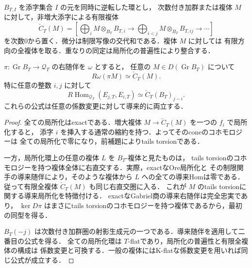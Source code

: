 $B_{T,I}$ を添字集合 $I$ の元を同時に逆転した環とし，
次数付き加群または複体 $M$ に対して，非増大添字による有限複体
\[
 \check C_T(M)=\left[
 \bigoplus_i M\otimes_{B_T}B_{T,i}\longrightarrow
 \bigoplus_{i<j}M\otimes_{B_T}B_{T,ij}\longrightarrow\cdots\right]
\]
を次数0から置く．微分は制限写像の交代和である．複体 $M$ に対しては
有限方向の全複体を取る．重なりの同定は局所化の普遍性により整合する．

\begin{proposition}[有限\v{C}ech模型]
\label{prop:artin-cech-model}
$\pi:\operatorname{Gr}B_T\to\mathcal Q_T$ の右随伴を $\omega$ とすると，
任意の $M\in D(\operatorname{Gr}B_T)$ について
\[
 R\omega(\pi M)\simeq\check C_T(M).
\]
特に任意の整数 $i,j$ に対して
\[
 R\operatorname{Hom}_{\mathcal Q_T}(E_{j,T},E_{i,T})
 \simeq\check C_T(B_T)_{j-i}.
\]
これらの公式は任意の係数変更に対して導来的に両立する．
\end{proposition}
\begin{proof}
全ての局所化はexactである．増大複体 $M\to\check C_T(M)$ を一つの $f_i$ で局所化すると，
添字 $i$ を挿入する通常の縮約を持つ．よってそのconeのコホモロジーは
全ての局所化で零になり，前補題によりtails torsionである．

一方，局所化環上の任意の複体 $L$ を $B_T$-複体と見たものは，
tails torsionのコホモロジーを持つ複体全体に右直交する．実際，exactなOre局所化と
その制限関手の導来随伴により，そのような複体から $L$ への全ての導来Homは零である．
従って有限全複体 $\check C_T(M)$ も同じ右直交圏に入る．
これが $M$ のtails torsionに関する導来局所化を特徴付ける．
exactなGabriel商の導来右随伴は完全忠実であり，
$\ker D\pi$ はまさにtails torsionのコホモロジーを持つ複体であるから，最初の同型を得る．

$B_T(-j)$ は次数付き加群圏の射影生成元の一つである．導来随伴を適用して二番目の公式を得る．
全ての局所化環は $T$-flatであり，局所化の普遍性と有限全複体の構成は
係数変更と可換する．一般の複体にはK-flatな係数変更を用いれば同じ公式が成立する．
\end{proof}

